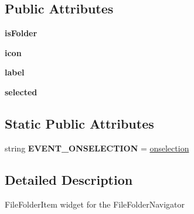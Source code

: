 \subsection*{Public Attributes}
\begin{DoxyCompactItemize}
\item 
{\bfseries is\+Folder}\hypertarget{classremi_1_1gui_1_1FileFolderItem_a0297b6a33bceb3d4cab83752cbdac36b}{}\label{classremi_1_1gui_1_1FileFolderItem_a0297b6a33bceb3d4cab83752cbdac36b}

\item 
{\bfseries icon}\hypertarget{classremi_1_1gui_1_1FileFolderItem_a45bb7c3ed4793d5cfeecc5e397d7056a}{}\label{classremi_1_1gui_1_1FileFolderItem_a45bb7c3ed4793d5cfeecc5e397d7056a}

\item 
{\bfseries label}\hypertarget{classremi_1_1gui_1_1FileFolderItem_aeccc1c14c3fecc96843dc86e0d62bc24}{}\label{classremi_1_1gui_1_1FileFolderItem_aeccc1c14c3fecc96843dc86e0d62bc24}

\item 
{\bfseries selected}\hypertarget{classremi_1_1gui_1_1FileFolderItem_a8712a71b590ca8b9e648c1d9b75824be}{}\label{classremi_1_1gui_1_1FileFolderItem_a8712a71b590ca8b9e648c1d9b75824be}

\end{DoxyCompactItemize}
\subsection*{Static Public Attributes}
\begin{DoxyCompactItemize}
\item 
string {\bfseries E\+V\+E\+N\+T\+\_\+\+O\+N\+S\+E\+L\+E\+C\+T\+I\+ON} = \textquotesingle{}\hyperlink{classremi_1_1gui_1_1FileFolderItem_a45ca805f6423493be1092ee380f4acb5}{onselection}\textquotesingle{}\hypertarget{classremi_1_1gui_1_1FileFolderItem_a5be6362f0539f9590f429303618682bd}{}\label{classremi_1_1gui_1_1FileFolderItem_a5be6362f0539f9590f429303618682bd}

\end{DoxyCompactItemize}


\subsection{Detailed Description}
\begin{DoxyVerb}FileFolderItem widget for the FileFolderNavigator\end{DoxyVerb}
 

